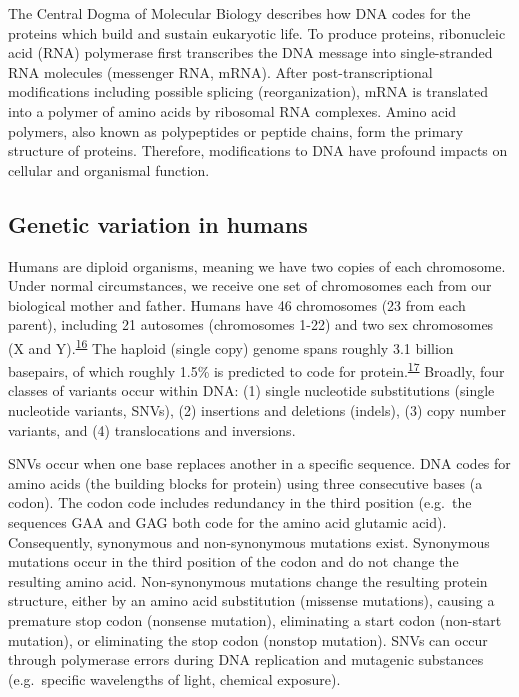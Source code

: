 \documentclass[11pt,letterpaper,oneside]{book}
\begin{document}
The Central Dogma of Molecular Biology describes how DNA codes for the proteins which build and sustain eukaryotic life.
To produce proteins, ribonucleic acid (RNA) polymerase first transcribes the DNA message into single-stranded RNA molecules (messenger RNA, mRNA).
After post-transcriptional modifications including possible splicing (reorganization), mRNA is translated into a polymer of amino acids by ribosomal RNA complexes.
Amino acid polymers, also known as polypeptides or peptide chains, form the primary structure of proteins.
Therefore, modifications to DNA have profound impacts on cellular and organismal function.

\hypertarget{genVar}{%
\subsection{Genetic variation in humans}\label{genVar}}

Humans are diploid organisms, meaning we have two copies of each chromosome.
Under normal circumstances, we receive one set of chromosomes each from our biological mother and father.
Humans have 46 chromosomes (23 from each parent), including 21 autosomes (chromosomes 1-22) and two sex chromosomes (X and Y).\textsuperscript{\protect\hyperlink{ref-tjio:1956aa}{16}}
The haploid (single copy) genome spans roughly 3.1 billion basepairs, of which roughly 1.5\% is predicted to code for protein.\textsuperscript{\protect\hyperlink{ref-lander:2001aa}{17}}
Broadly, four classes of variants occur within DNA: (1) single nucleotide substitutions (single nucleotide variants, SNVs), (2) insertions and deletions (indels), (3) copy number variants, and (4) translocations and inversions.

SNVs occur when one base replaces another in a specific sequence.
DNA codes for amino acids (the building blocks for protein) using three consecutive bases (a codon).
The codon code includes redundancy in the third position (e.g.~the sequences GAA and GAG both code for the amino acid glutamic acid).
Consequently, synonymous and non-synonymous mutations exist.
Synonymous mutations occur in the third position of the codon and do not change the resulting amino acid.
Non-synonymous mutations change the resulting protein structure, either by an amino acid substitution (missense mutations), causing a premature stop codon (nonsense mutation), eliminating a start codon (non-start mutation), or eliminating the stop codon (nonstop mutation).
SNVs can occur through polymerase errors during DNA replication and mutagenic substances (e.g.~specific wavelengths of light, chemical exposure).
\end{document}
